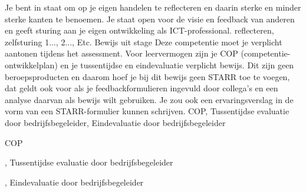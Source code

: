 
\competentie
{%
	\competentieformulier
	{%
		Je bent in staat om op je eigen handelen te reflecteren en daarin sterke en minder sterke kanten te benoemen. Je staat open voor de visie en feedback van anderen en geeft sturing aan je eigen ontwikkeling als ICT-professional.
	}
	{%
		reflecteren,%
		zelfsturing%
	}
	{%
		1...,%
		2...,%
		Etc.%
	}
	{%
		Bewijs uit stage
	}
	{%
		Deze competentie moet je verplicht aantonen tijdens het assessment. Voor leervermogen zijn  je COP (competentie-ontwikkelplan) en je tussentijdse en eindevaluatie verplicht bewijs. Dit zijn geen beroepsproducten en daarom hoef je bij dit bewijs geen STARR toe te voegen, dat geldt ook voor als je feedbackformulieren ingevuld door collega’s en een analyse daarvan als bewijs wilt gebruiken. Je zou ook een ervaringsverslag in de vorm van een STARR-formulier kunnen schrijven.
	}
	{%
		COP,%
		Tussentijdse evaluatie door bedrijfsbegeleider,%
		Eindevaluatie door bedrijfsbegeleider%
	}
}
{%
	\bewijs
	{%
		COP
	}
	{}
	{%
		
	},
	\bewijs
	{%
		Tussentijdse evaluatie door bedrijfsbegeleider
	}
	{}
	{%
		
	},
	\bewijs
	{%
		Eindevaluatie door bedrijfsbegeleider
	}
	{}
	{%
		
	}
}
